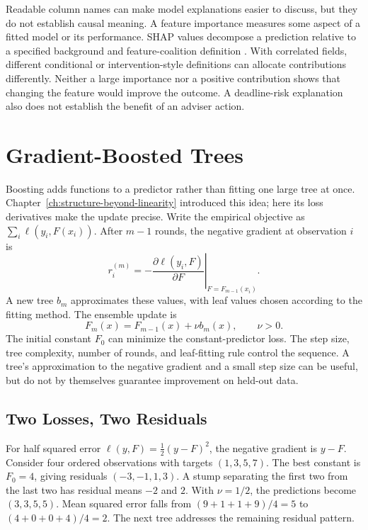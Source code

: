 Readable column names can make model explanations easier to discuss, but they do not establish causal meaning. A feature importance measures some aspect of a fitted model or its performance. SHAP values decompose a prediction relative to a specified background and feature-coalition definition \citep{lundberg2017shap}. With correlated fields, different conditional or intervention-style definitions can allocate contributions differently. Neither a large importance nor a positive contribution shows that changing the feature would improve the outcome. A deadline-risk explanation also does not establish the benefit of an adviser action.

\section{Gradient-Boosted Trees}
\label{sec:gbt}

Boosting adds functions to a predictor rather than fitting one large tree at once. Chapter~\ref{ch:structure-beyond-linearity} introduced this idea; here its loss derivatives make the update precise. Write the empirical objective as $\sum_i\ell(y_i,F(x_i))$. After $m-1$ rounds, the negative gradient at observation $i$ is
\[
r_i^{(m)}=-\left.\frac{\partial\ell(y_i,F)}{\partial F}\right|_{F=F_{m-1}(x_i)}.
\]
A new tree $b_m$ approximates these values, with leaf values chosen according to the fitting method. The ensemble update is
\[
F_m(x)=F_{m-1}(x)+\nu b_m(x),\qquad \nu>0.
\]
The initial constant $F_0$ can minimize the constant-predictor loss. The step size, tree complexity, number of rounds, and leaf-fitting rule control the sequence. A tree's approximation to the negative gradient and a small step size can be useful, but do not by themselves guarantee improvement on held-out data.

\subsection{Two Losses, Two Residuals}

For half squared error $\ell(y,F)=\tfrac12(y-F)^2$, the negative gradient is $y-F$. Consider four ordered observations with targets $(1,3,5,7)$. The best constant is $F_0=4$, giving residuals $(-3,-1,1,3)$. A stump separating the first two from the last two has residual means $-2$ and $2$. With $\nu=1/2$, the predictions become $(3,3,5,5)$. Mean squared error falls from $(9+1+1+9)/4=5$ to $(4+0+0+4)/4=2$. The next tree addresses the remaining residual pattern.

